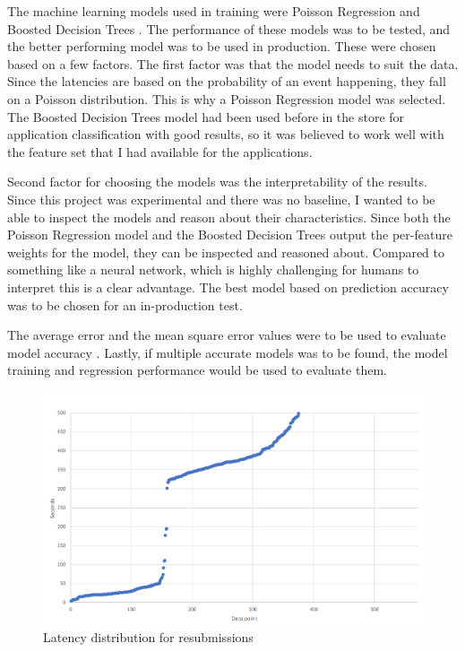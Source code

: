 
The machine learning models used in training were Poisson Regression \cite{azurepoisson} and Boosted Decision Trees \cite{azurebdt}.
The performance of these models was to be tested, and the better performing model was to be used in production.
These were chosen based on a few factors.
The first factor was that the model needs to suit the data.
Since the latencies are based on the probability of an event happening, they fall on a Poisson distribution. 
This is why a Poisson Regression model was selected.
The Boosted Decision Trees model had been used before in the store for application classification with good results, so it was believed to work well with 
the feature set that I had available for the applications.


Second factor for choosing the models was the interpretability of the results.
Since this project was experimental and there was no baseline, I wanted to be able to inspect the models and reason about their characteristics.
Since both the Poisson Regression model and the Boosted Decision Trees output the per-feature weights for the model, they can be inspected and reasoned about.
Compared to something like a neural network, which is highly challenging for humans to interpret  this is a clear advantage.
The best model based on prediction accuracy was to be chosen for an in-production test.

The average error and the mean square error values were to be used to evaluate model accuracy .
Lastly, if multiple accurate models was to be found, the model training and regression performance would be used to evaluate them.

\begin{figure}[htb]
    \centering \includegraphics[width=0.6\linewidth]{gfx/resubmissions.png}
    \caption{Latency distribution for resubmissions }
    \label{fig:resubmissions}
\end{figure}

